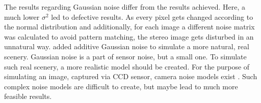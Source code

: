 The results regarding Gaussian noise differ from the results \citeauthor{richardt2010real} \citep{richardt2010real} achieved.
Here, a much lower $\sigma^2$ led to defective results.
As every pixel gets changed according to the normal distribution and additionally, for each image a different noise matrix was calculated to avoid pattern matching, the stereo image gets disturbed in an unnatural way.
\citeauthor{richardt2010real} added additive Gaussian noise to simulate a more natural, real scenery.
Gaussian noise is a part of sensor noise, but a small one.
To simulate such real scenery, a more realistic model should be created.
For the purpose of simulating an image, captured via CCD sensor, camera noise models exist \citep{liu2006noise}.
Such complex noise models are difficult to create, but maybe lead to much more feasible results.


























